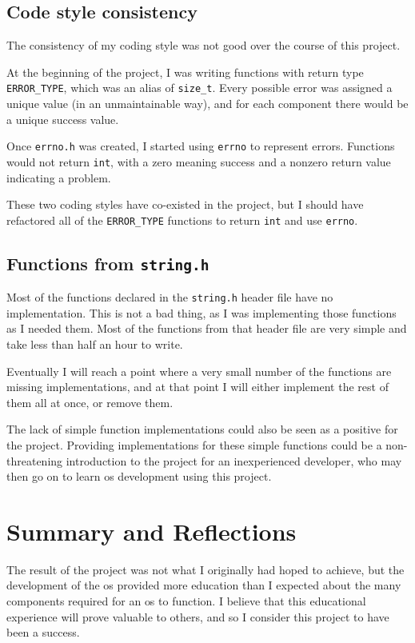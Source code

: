 \documentclass{article}
\begin{document}
\subsection{Code style consistency}
The consistency of my coding style was not good over the course of this
project.

At the beginning of the project, I was writing functions with return
type \verb!ERROR_TYPE!, which was an alias of \verb!size_t!. Every possible
error was assigned a unique value (in an unmaintainable way), and for each
component there would be a unique success value.

Once \texttt{errno.h} was created, I started using \texttt{errno} to represent
errors. Functions would not return \texttt{int}, with a zero meaning success
and a nonzero return value indicating a problem.

These two coding styles have co-existed in the project, but I should have
refactored all of the \verb!ERROR_TYPE! functions to return \texttt{int} and
use \texttt{errno}.

\subsection{Functions from \texttt{string.h}}
Most of the functions declared in the \texttt{string.h} header file have no
implementation. This is not a bad thing, as I was implementing those functions
as I needed them. Most of the functions from that header file are very simple
and take less than half an hour to write.

Eventually I will reach a point where a very small number of the functions are
missing implementations, and at that point I will either implement the rest of
them all at once, or remove them.

The lack of simple function implementations could also be seen as a positive
for the project. Providing implementations for these simple functions could be
a non-threatening introduction to the project for an inexperienced developer,
who may then go on to learn \gls{os} development using this project.

\section{Summary and Reflections}
The result of the project was not what I originally had hoped to achieve, but
the development of the \gls{os} provided more education than I expected about
the many components required for an \gls{os} to function. I believe that this
educational experience will prove valuable to others, and so I consider this
project to have been a success.
\end{document}
